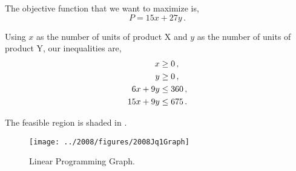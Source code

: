 %
%

\begin{subquestions}
	

\subquestion

The objective function that we want to maximize is,
\begin{equation}
	P=15x + 27y \,. 
\end{equation}

Using $x$ as the number of units of product X and $y$ as the number of units of product Y, our inequalities are,
\begin{align}
	x & \geq 0 \,, \nonumber \\
	y & \geq 0 \,, \nonumber \\
	6x + 9y & \leq 360 \,, \nonumber \\
	15x + 9y & \leq 675 \,.
\end{align}


\subquestion

The feasible region is shaded in .

\begin{center}

\begin{figure}
	\begin{center}
		\texttt{[image: ../2008/figures/2008Jq1Graph]}
		\caption{\label{2008J:q1:fig:Graph} Linear Programming Graph.}
	\end{center}
\end{figure}

\end{center}


\end{subquestions}
